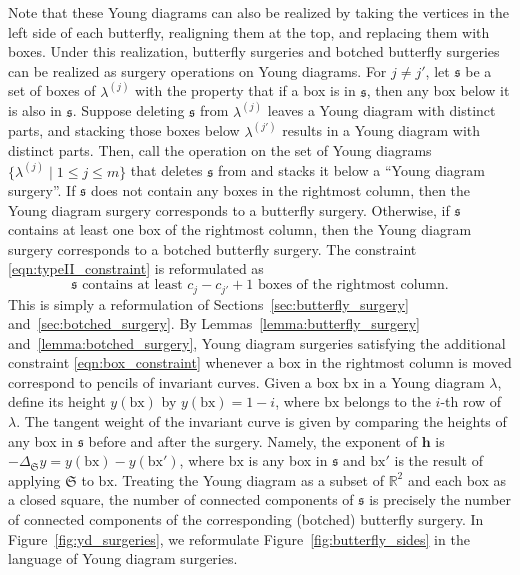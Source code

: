 \documentclass[11pt]{article}
\numberwithin{equation}{section}
\newcommand{\RR}{\mathbb R}
\newcommand{\hb}{\mathbf h}
\newcommand{\site}{\mathfrak s}
\newcommand{\surgery}{\mathfrak S}
\newcommand{\bx}{\mathrm{bx}}
\begin{document}
Note that these Young diagrams can also be realized by taking the vertices in the left side of each butterfly, realigning them at the top, and replacing them with boxes. Under this realization, butterfly surgeries and botched butterfly surgeries can be realized as surgery operations on Young diagrams. For $j\neq j'$, let $\site$ be a set of boxes of $\lambda^{(j)}$ with the property that if a box is in $\site$, then any box below it is also in $\site$. Suppose deleting $\site$ from $\lambda^{(j)}$ leaves a Young diagram with distinct parts, and stacking those boxes below $\lambda^{(j')}$ results in a Young diagram with distinct parts. Then, call the operation on the set of Young diagrams $\big\{\lambda^{(j)} \mid 1\leq j \leq m\big\}$ that deletes $\site$ from  and stacks it below  a ``Young diagram surgery''. If $\site$ does not contain any boxes in the rightmost column, then the Young diagram surgery corresponds to a butterfly surgery. Otherwise, if $\site$ contains at least one box of the rightmost column, then the Young diagram surgery corresponds to a botched butterfly surgery. The constraint \eqref{eqn:typeII_constraint} is reformulated as
\begin{equation} \label{eqn:box_constraint}
\site\text{ contains at least }c_j - c_{j'} + 1\text{ boxes of the rightmost column.}
\end{equation}
This is simply a reformulation of Sections~\ref{sec:butterfly_surgery} and~\ref{sec:botched_surgery}. By Lemmas~\ref{lemma:butterfly_surgery} and~\ref{lemma:botched_surgery}, Young diagram surgeries satisfying the additional constraint \eqref{eqn:box_constraint} whenever a box in the rightmost column is moved correspond to pencils of invariant curves. Given a box $\bx$ in a Young diagram $\lambda$, define its height $y(\bx)$ by $y(\bx) = 1 - i$, where $\bx$ belongs to the $i$-th row of $\lambda$. The tangent weight of the invariant curve is given by comparing the heights of any box in $\site$ before and after the surgery. Namely, the exponent of $\hb$ is $-\Delta_\surgery y = y(\bx)-y(\bx')$, where $\bx$ is any box in $\site$ and $\bx'$ is the result of applying $\surgery$ to $\bx$. Treating the Young diagram as a subset of $\RR^2$ and each box as a closed square, the number of connected components of $\site$ is precisely the number of connected components of the corresponding (botched) butterfly surgery. In Figure~\ref{fig:yd_surgeries}, we reformulate Figure~\ref{fig:butterfly_sides} in the language of Young diagram surgeries.
\end{document}
